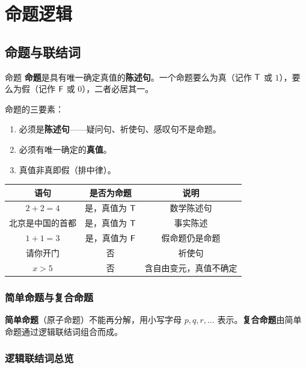\chapter{命题逻辑}

\section{命题与联结词}

\begin{mydefinition}{命题}
\textbf{命题}是具有唯一确定真值的\textbf{陈述句}。一个命题要么为真（记作 $\mathsf{T}$ 或 $1$），要么为假（记作 $\mathsf{F}$ 或 $0$），二者必居其一。
\end{mydefinition}

命题的三要素：
\begin{enumerate}
\item 必须是\textbf{陈述句}——疑问句、祈使句、感叹句不是命题。
\item 必须有唯一确定的\textbf{真值}。
\item 真值非真即假（排中律）。
\end{enumerate}

\begin{center}
\begin{tabular}{c|c|c}
\toprule
语句 & 是否为命题 & 说明 \\
\midrule
$2+2=4$ & 是，真值为 $\mathsf{T}$ & 数学陈述句 \\
北京是中国的首都 & 是，真值为 $\mathsf{T}$ & 事实陈述 \\
$1+1=3$ & 是，真值为 $\mathsf{F}$ & 假命题仍是命题 \\
请你开门 & 否 & 祈使句 \\
$x>5$ & 否 & 含自由变元，真值不确定 \\
\bottomrule
\end{tabular}
\end{center}

\subsection*{简单命题与复合命题}

\textbf{简单命题}（原子命题）不能再分解，用小写字母 $p,q,r,\dots$ 表示。\textbf{复合命题}由简单命题通过逻辑联结词组合而成。

\subsection{逻辑联结词总览}

